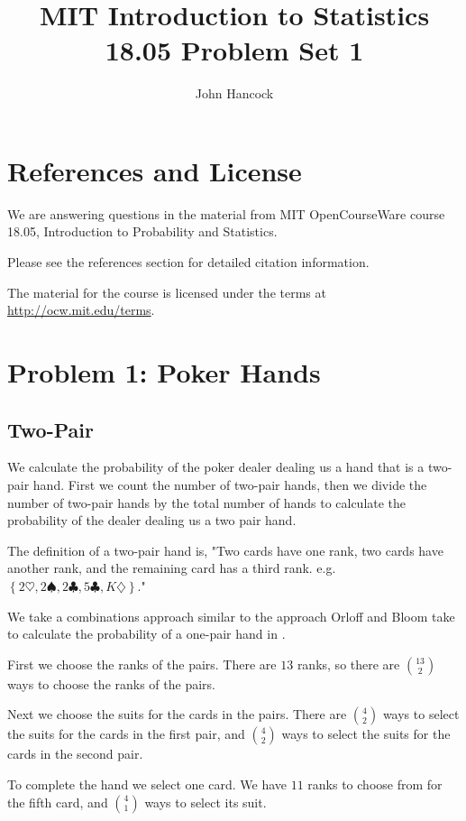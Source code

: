 \documentclass[a4paper,11pt]{article}
\author{John Hancock}
\title{MIT Introduction to Statistics 18.05 Problem Set 1}
\begin{document}
\maketitle
\tableofcontents
\section{References and License}
We are answering questions in the material from MIT OpenCourseWare
course 18.05, Introduction to Probability and Statistics.

Please see the references section for detailed citation information.

The material for the course is licensed under the terms at 
\url{http://ocw.mit.edu/terms}.

\section{Problem 1: Poker Hands}
\subsection{Two-Pair}
We calculate the probability of the poker dealer dealing us a 
hand that is a two-pair hand. First we count the number of two-pair
hands, then we divide the number of two-pair hands by the total
number of hands to calculate the probability of the dealer dealing us
a two pair hand.

The definition of a two-pair hand is, "Two cards have one rank, 
two cards have another rank, and the remaining card has a third rank.
e.g.$\left\{ 2\heartsuit, 2\spadesuit, 2\clubsuit, 5
\clubsuit, K\diamondsuit \right\}$." \cite{probSet1}

We take a combinations approach similar to the approach Orloff and
Bloom take to calculate the probability of a one-pair hand in
\cite{classSlides2}.

First we choose the ranks of the pairs.  There are $13$ ranks, so
there are $\binom{13}{2}$ ways to choose the ranks of the pairs.

Next we choose the suits for the cards in the pairs.  There are
$\binom{4}{2}$ ways to select the suits for the cards in the first
pair, and $\binom{4}{2}$ ways to select the suits for the cards in
the second pair.

To complete the hand we select one card.  We have $11$ ranks to choose
from for the fifth card, and $\binom{4}{1}$ ways to select its suit.
\end{document}
